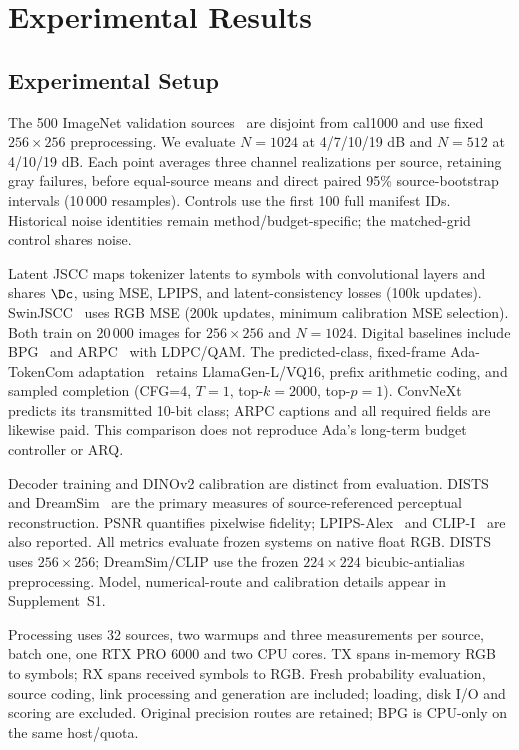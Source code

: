 \section{Experimental Results}
\ifCLASSOPTIONonecolumn\fi
\subsection{Experimental Setup}
The 500 ImageNet validation sources~\cite{imagenet} are disjoint from cal1000 and use fixed $256\times256$ preprocessing. We evaluate $N=1024$ at 4/7/10/19 dB and $N=512$ at 4/10/19 dB. Each point averages three channel realizations per source, retaining gray failures, before equal-source means and direct paired 95\% source-bootstrap intervals (10\,000 resamples). Controls use the first 100 full manifest IDs. Historical noise identities remain method/budget-specific; the matched-grid control shares noise.

Latent JSCC maps tokenizer latents to symbols with convolutional layers and shares $\Dc$, using MSE, LPIPS, and latent-consistency losses (100k updates). SwinJSCC~\cite{swinjscc} uses RGB MSE (200k updates, minimum calibration MSE selection). Both train on 20\,000 images for $256\times256$ and $N=1024$. Digital baselines include BPG~\cite{bpg} and ARPC~\cite{arpc} with LDPC/QAM. The predicted-class, fixed-frame Ada-TokenCom adaptation~\cite{adatokencom} retains LlamaGen-L/VQ16, prefix arithmetic coding, and sampled completion (CFG=4, $T=1$, top-$k=2000$, top-$p=1$). ConvNeXt predicts its transmitted 10-bit class; ARPC captions and all required fields are likewise paid. This comparison does not reproduce Ada's long-term budget controller or ARQ.

Decoder training and DINOv2 calibration are distinct from evaluation. DISTS~\cite{dists} and DreamSim~\cite{dreamsim} are the primary measures of source-referenced perceptual reconstruction. PSNR quantifies pixelwise fidelity; LPIPS-Alex~\cite{lpips} and CLIP-I~\cite{clip} are also reported. All metrics evaluate frozen systems on native float RGB. DISTS uses $256\times256$; DreamSim/CLIP use the frozen $224\times224$ bicubic-antialias preprocessing. Model, numerical-route and calibration details appear in Supplement~S1.

Processing uses 32 sources, two warmups and three measurements per source, batch one, one RTX PRO 6000 and two CPU cores. TX spans in-memory RGB to symbols; RX spans received symbols to RGB. Fresh probability evaluation, source coding, link processing and generation are included; loading, disk I/O and scoring are excluded. Original precision routes are retained; BPG is CPU-only on the same host/quota.

